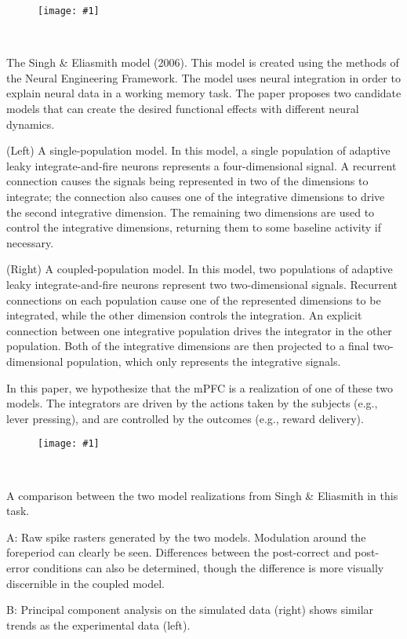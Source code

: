 \documentclass[12pt]{article}
\newcommand{\scalefigone}[3]{
  \begin{figure}[ht!]
    \centering
    \texttt{[image: \#1]}
    \caption{#3}
    \label{#1}
  \end{figure}}
\begin{document}
\clearpage

\scalefigone{f3_blocks.pdf}{1.0}{~}

The Singh \& Eliasmith model (2006).
This model is created using the methods of the
Neural Engineering Framework.
The model uses neural integration in order to explain
neural data in a working memory task.
The paper proposes two candidate models
that can create the desired functional effects
with different neural dynamics.

(Left) A single-population model.
In this model, a single population of
adaptive leaky integrate-and-fire neurons represents
a four-dimensional signal.
A recurrent connection causes the signals
being represented in two of the dimensions
to integrate; the connection
also causes one of the integrative dimensions
to drive the second integrative dimension.
The remaining two dimensions are used
to control the integrative dimensions,
returning them to some baseline activity if necessary.

(Right) A coupled-population model.
In this model, two populations of
adaptive leaky integrate-and-fire neurons represent
two two-dimensional signals.
Recurrent connections on each population cause
one of the represented dimensions to be integrated,
while the other dimension controls the integration.
An explicit connection between one integrative population
drives the integrator in the other population.
Both of the integrative dimensions are then
projected to a final two-dimensional population,
which only represents the integrative signals.

In this paper, we hypothesize that the mPFC
is a realization of one of these two models.
The integrators are driven by the actions taken by the subjects
(e.g., lever pressing),
and are controlled by the outcomes
(e.g., reward delivery).

\clearpage

\scalefigone{f3_pca.pdf}{1.0}{~}

A comparison between the two model realizations
from Singh \& Eliasmith in this task.

A: Raw spike rasters generated by the two models.
Modulation around the foreperiod can clearly be seen.
Differences between the post-correct and post-error
conditions can also be determined,
though the difference is more visually discernible
in the coupled model.

B: Principal component analysis
on the simulated data (right) shows similar trends
as the experimental data (left).
\end{document}
